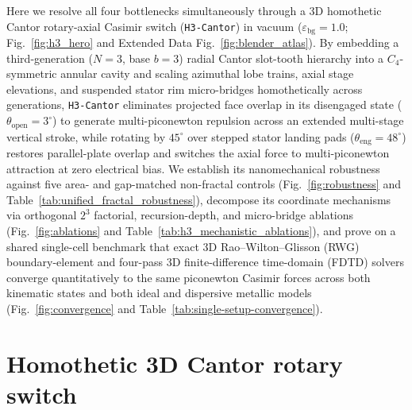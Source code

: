 \documentclass[pdflatex,sn-nature]{sn-jnl}
\begin{document}
Here we resolve all four bottlenecks simultaneously through a 3D homothetic Cantor rotary-axial Casimir switch (\texttt{H3-Cantor}) in vacuum ($\varepsilon_{\mathrm{bg}}=1.0$; Fig.~\ref{fig:h3_hero} and Extended Data Fig.~\ref{fig:blender_atlas}). By embedding a third-generation ($N=3$, base $b=3$) radial Cantor slot-tooth hierarchy into a $C_4$-symmetric annular cavity and scaling azimuthal lobe trains, axial stage elevations, and suspended stator rim micro-bridges homothetically across generations, \texttt{H3-Cantor} eliminates projected face overlap in its disengaged state ($\theta_{\mathrm{open}}=3^\circ$) to generate multi-piconewton repulsion across an extended multi-stage vertical stroke, while rotating by $45^\circ$ over stepped stator landing pads ($\theta_{\mathrm{eng}}=48^\circ$) restores parallel-plate overlap and switches the axial force to multi-piconewton attraction at zero electrical bias. We establish its nanomechanical robustness against five area- and gap-matched non-fractal controls (Fig.~\ref{fig:robustness} and Table~\ref{tab:unified_fractal_robustness}), decompose its coordinate mechanisms via orthogonal $2^3$ factorial, recursion-depth, and micro-bridge ablations (Fig.~\ref{fig:ablations} and Table~\ref{tab:h3_mechanistic_ablations}), and prove on a shared single-cell benchmark that exact 3D Rao--Wilton--Glisson (RWG) boundary-element\cite{rao1982,reid2013pra} and four-pass 3D finite-difference time-domain (FDTD)\cite{rodriguez2009pra,oskooi2010} solvers converge quantitatively to the same piconewton Casimir forces across both kinematic states and both ideal and dispersive metallic models (Fig.~\ref{fig:convergence} and Table~\ref{tab:single-setup-convergence}).

\section*{Homothetic 3D Cantor rotary switch}
\label{sec:architecture}
\end{document}
